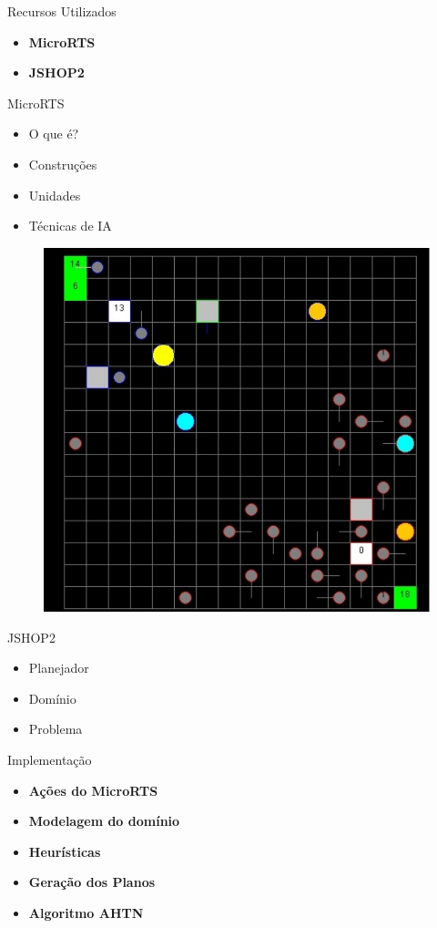 \documentclass{beamer}
\begin{document}
{
	\begin{frame}{Recursos Utilizados}
		\vspace{5mm}
		\begin{itemize}
			\item \textbf{MicroRTS}
			\item \textbf{JSHOP2}
		\end{itemize}
	\end{frame}
}
\begin{frame}{MicroRTS}
	\begin{itemize}
		\item O que é?
		\item Construções
		\item Unidades
		\item Técnicas de IA
	\end{itemize}
	\vspace{-3mm}
	\begin{figure}[here]
		\includegraphics[width=0.4\linewidth]{fig/microRTS.pdf}	
	\end{figure}	
\end{frame}
\begin{frame}{JSHOP2}
	\begin{itemize}
		\item Planejador
		\item Domínio
		\item Problema
	\end{itemize}
\end{frame}

{
	\begin{frame}{Implementação}
		\vspace{5mm}
		\begin{itemize}
			\item \textbf{Ações do MicroRTS}
			\item \textbf{Modelagem do domínio}
			\item \textbf{Heurísticas}
			\item \textbf{Geração dos Planos}
			\item \textbf{Algoritmo AHTN}
		\end{itemize}
	\end{frame}
}
\end{document}
